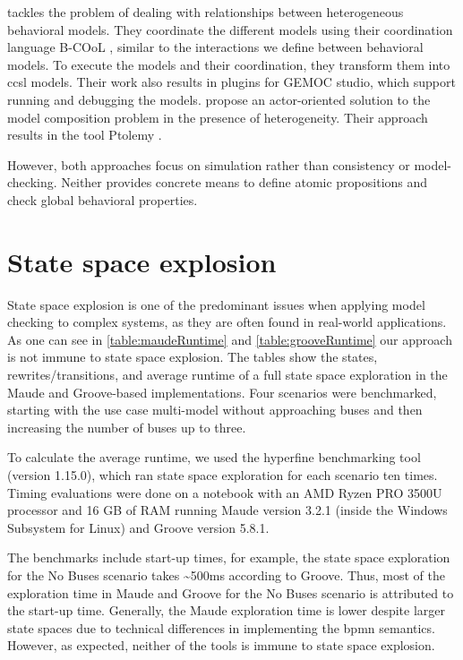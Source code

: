 \documentclass{jot}
\begin{document}
\cite{deantoniModelingBehavioralSemantics2016} tackles the problem of dealing with relationships between heterogeneous behavioral models.
They coordinate the different models using their coordination language B-COoL \cite{varalarsenBCoolBehavioralCoordination2016}, similar to the interactions we define between behavioral models.
To execute the models and their coordination, they transform them into \gls*{ccsl} models.  
Their work also results in plugins for GEMOC studio, which support running and debugging the models.
\cite{ekerTamingHeterogeneityPtolemy2003, leeDisciplinedHeterogeneousModeling2010} propose an actor-oriented solution to the model composition problem in the presence of heterogeneity.
Their approach results in the tool Ptolemy \cite{ptolemaeusSystemDesignModeling2014}.

However, both approaches focus on simulation rather than consistency or model-checking.
Neither provides concrete means to define atomic propositions and check global behavioral properties.

\section{State space explosion}
State space explosion is one of the predominant issues when applying model checking to complex systems, as they are often found in real-world applications.
As one can see in \autoref{table:maudeRuntime} and \autoref{table:grooveRuntime} our approach is not immune to state space explosion.
The tables show the states, rewrites/transitions, and average runtime of a full state space exploration in the Maude and Groove-based implementations.
Four scenarios were benchmarked, starting with the use case multi-model without approaching buses and then increasing the number of buses up to three.

To calculate the average runtime, we used the hyperfine benchmarking tool \cite{peterHyperfine2022} (version 1.15.0), which ran state space exploration for each scenario ten times.
Timing evaluations were done on a notebook with an AMD Ryzen PRO 3500U processor and 16 GB of RAM running Maude version 3.2.1 (inside the Windows Subsystem for Linux) and Groove version 5.8.1.

The benchmarks include start-up times, for example, the state space exploration for the \textsf{No Buses} scenario takes \textasciitilde 500ms according to Groove.
Thus, most of the exploration time in Maude and Groove for the \textsf{No Buses} scenario is attributed to the start-up time.
Generally, the Maude exploration time is lower despite larger state spaces due to technical differences in implementing the \gls*{bpmn} semantics.
However, as expected, neither of the tools is immune to state space explosion.
\end{document}

